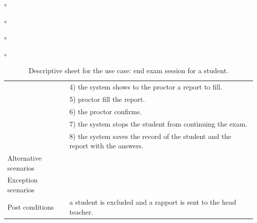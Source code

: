 \documentclass[]{uc2pfecaneva}
\begin{document}
\begin{list}{$\circ$}{}
\begin{list}{$\circ$}{}
\begin{list}{$\circ$}{}
\begin{list}{$\circ$}{}
\begin{table}[h]
\begin{tabularx}{\textwidth}{|l|X|}
            & 4) the system shows to the proctor a report to fill.                                                                   \\
            & 5) proctor fill the report.                                                                                            \\
            & 6) the proctor confirms.                                                                                                  \\
            & 7) the system stops the student from continuing the exam.                                                              \\
            & 8) the system saves the record of the student and the report with the answers.                                         \\ \hline
            Alternative scenarios
            \\ \hline
            Exception scenarios
            \\ \hline
            Post conditions
            & a student is excluded and a rapport is sent to the head teacher.                                                       \\ \hline
        \end{tabularx}
        \caption{Descriptive sheet for the use case: end exam session for a student.}
        \label{table:5}
    \end{table}
    \clearpage


    \begin{figure}[h]

\end{figure}
\end{list}
\end{list}
\end{list}
\end{list}
\end{document}
